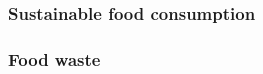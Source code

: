\documentclass[../summary.tex]{subfiles}
\begin{document}
	\subsubsection{Sustainable food consumption}
	
	\subsubsection{Food waste}
	
	
\end{document}
